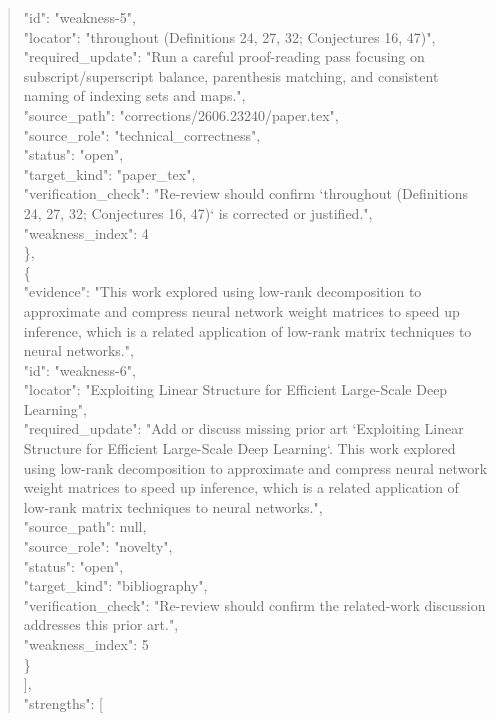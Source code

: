 \documentclass[11pt]{article}
\begin{document}
\begin{quote}
      "id": "weakness-5",\\
      "locator": "throughout (Definitions 24, 27, 32; Conjectures 16, 47)",\\
      "required\_update": "Run a careful proof-reading pass focusing on subscript/superscript balance, parenthesis matching, and consistent naming of indexing sets and maps.",\\
      "source\_path": "corrections/2606.23240/paper.tex",\\
      "source\_role": "technical\_correctness",\\
      "status": "open",\\
      "target\_kind": "paper\_tex",\\
      "verification\_check": "Re-review should confirm `throughout (Definitions 24, 27, 32; Conjectures 16, 47)` is corrected or justified.",\\
      "weakness\_index": 4\\
    \},\\
    \{\\
      "evidence": "This work explored using low-rank decomposition to approximate and compress neural network weight matrices to speed up inference, which is a related application of low-rank matrix techniques to neural networks.",\\
      "id": "weakness-6",\\
      "locator": "Exploiting Linear Structure for Efficient Large-Scale Deep Learning",\\
      "required\_update": "Add or discuss missing prior art `Exploiting Linear Structure for Efficient Large-Scale Deep Learning`. This work explored using low-rank decomposition to approximate and compress neural network weight matrices to speed up inference, which is a related application of low-rank matrix techniques to neural networks.",\\
      "source\_path": null,\\
      "source\_role": "novelty",\\
      "status": "open",\\
      "target\_kind": "bibliography",\\
      "verification\_check": "Re-review should confirm the related-work discussion addresses this prior art.",\\
      "weakness\_index": 5\\
    \}\\
  ],\\
  "strengths": [\\

\end{quote}
\end{document}
